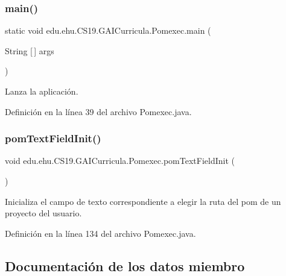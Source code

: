 \subsubsection{\texorpdfstring{main()}{main()}}
{\footnotesize\ttfamily static void edu.\+ehu.\+C\+S19.\+G\+A\+I\+Curricula.\+Pomexec.\+main (\begin{DoxyParamCaption}\item[{String \mbox{[}$\,$\mbox{]}}]{args }\end{DoxyParamCaption})\hspace{0.3cm}{\ttfamily [static]}}



Lanza la aplicación. 



Definición en la línea 39 del archivo Pomexec.\+java.

\mbox{\label{a00029_a99d8b8d9e55a300b5ce6f7cc7d546a26}} 
\subsubsection{\texorpdfstring{pomTextFieldInit()}{pomTextFieldInit()}}
{\footnotesize\ttfamily void edu.\+ehu.\+C\+S19.\+G\+A\+I\+Curricula.\+Pomexec.\+pom\+Text\+Field\+Init (\begin{DoxyParamCaption}{ }\end{DoxyParamCaption})}



Inicializa el campo de texto correspondiente a elegir la ruta del pom de un proyecto del usuario. 



Definición en la línea 134 del archivo Pomexec.\+java.



\subsection{Documentación de los datos miembro}
\mbox{\label{a00029_ac458a48643144b5728bb22fdace1dada}} 
